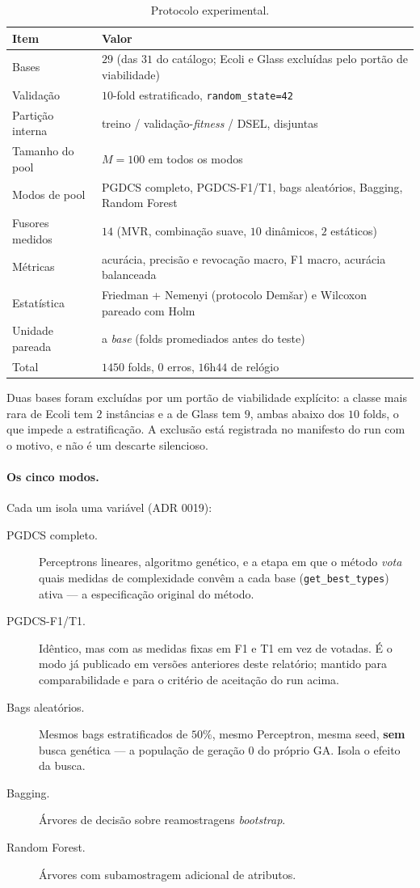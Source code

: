 \begin{table}[htbp]
\centering\small
\caption{Protocolo experimental.}
\begin{tabular}{ll}
\toprule
Item & Valor \\
\midrule
Bases & $29$ (das $31$ do catálogo; Ecoli e Glass excluídas pelo portão de viabilidade) \\
Validação & $10$-fold estratificado, \texttt{random\_state=42} \\
Partição interna & treino / validação-\emph{fitness} / DSEL, disjuntas \\
Tamanho do pool & $M=100$ em todos os modos \\
Modos de pool & PGDCS completo, PGDCS-F1/T1, bags aleatórios, Bagging, Random Forest \\
Fusores medidos & $14$ (MVR, combinação suave, $10$ dinâmicos, $2$ estáticos) \\
Métricas & acurácia, precisão e revocação macro, F1 macro, acurácia balanceada \\
Estatística & Friedman + Nemenyi (protocolo Dem\v{s}ar) e Wilcoxon pareado com Holm \\
Unidade pareada & a \emph{base} (folds promediados antes do teste) \\
Total & $1450$ folds, $0$ erros, $16$h$44$ de relógio \\
\bottomrule
\end{tabular}
\end{table}

Duas bases foram excluídas por um portão de viabilidade explícito: a classe mais
rara de Ecoli tem $2$ instâncias e a de Glass tem $9$, ambas abaixo dos $10$ folds,
o que impede a estratificação. A exclusão está registrada no manifesto do run com o
motivo, e não é um descarte silencioso.

\paragraph{Os cinco modos.} Cada um isola uma variável (ADR 0019):

\begin{description}
\item[PGDCS completo.] Perceptrons lineares, algoritmo genético, e a etapa em que o
método \emph{vota} quais medidas de complexidade convêm a cada base
(\texttt{get\_best\_types}) ativa --- a especificação original do método.
\item[PGDCS-F1/T1.] Idêntico, mas com as medidas fixas em F1 e T1 em vez de votadas.
É o modo já publicado em versões anteriores deste relatório; mantido para
comparabilidade e para o critério de aceitação do run acima.
\item[Bags aleatórios.] Mesmos bags estratificados de $50\%$, mesmo Perceptron,
mesma seed, \textbf{sem} busca genética --- a população de geração $0$ do próprio
GA. Isola o efeito da busca.
\item[Bagging.] Árvores de decisão sobre reamostragens \emph{bootstrap}.
\item[Random Forest.] Árvores com subamostragem adicional de atributos.
\end{description}


